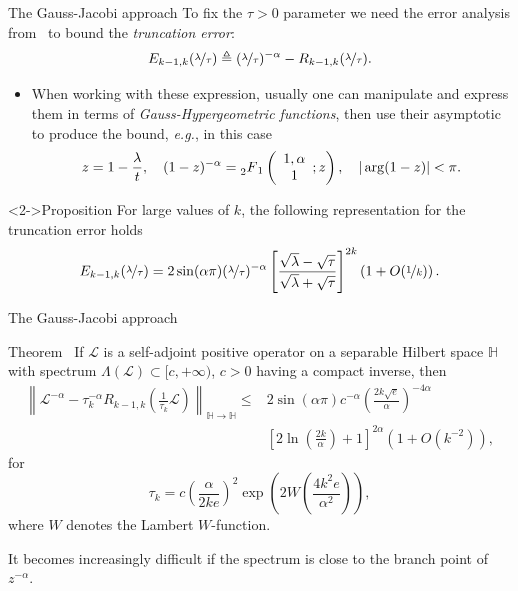 \documentclass[aspectratio=169,xcolor=dvipsnames]{beamer}
\begin{document}
	\begin{frame}{The Gauss-Jacobi approach}
	To fix the $\tau > 0$ parameter we need the error analysis from~\parencite{MR3987166} to bound the \emph{truncation error}:
	\[
	E_{k-1,k}(\nicefrac{\lambda}{\tau}) \triangleq (\nicefrac{\lambda}{\tau})^{-\alpha} - R_{k-1,k}(\nicefrac{\lambda}{\tau}).
	\]
	\begin{itemize}\vspace{-1em}
		\item[\faBomb] When working with these expression, usually one can manipulate and express them in terms of \emph{Gauss-Hypergeometric functions}, then use their asymptotic to produce the bound, \emph{e.g.}, in this case
		\[
		z = 1 - \frac{\lambda}{t}, \quad (1-z)^{-\alpha} = \prescript{}{2}{F}_1\left( \begin{array}{c}
		1, \alpha \\
		1
		\end{array}; z \right), \quad |\arg(1-z)| < \pi.
		\] 
	\end{itemize}\vspace{-0.3em}
	\begin{alertblock}<2->{Proposition \parencite[Proposition 2]{MR3987166}}
	For large values of $k$, the following representation for the truncation error holds\vspace{-0.8em}
	\[
	E_{k-1,k}(\nicefrac{\lambda}{\tau}) = 2 \sin(\alpha \pi) (\nicefrac{\lambda}{\tau})^{-\alpha} \left[ \frac{\sqrt{\lambda} - \sqrt{\tau}}{\sqrt{\lambda} + \sqrt{\tau}} \right]^{2k} \left(1 + O(\nicefrac{1}{k})\right).
	\]
	\end{alertblock}
	\end{frame}

	\begin{frame}{The Gauss-Jacobi approach}
		
	\begin{alertblock}{Theorem~\parencite[Theorem 2]{MR3987166}}
	If $\mathcal{L}$ is a self-adjoint positive operator on a separable Hilbert space $\mathbb{H}$ with spectrum $\Lambda(\mathcal{L}) \subset [c,+\infty)$, $c > 0$ having a compact inverse, then
	\[
	\begin{split}
	\left\| \mathcal{L}^{-\alpha} - \tau_k^{-\alpha} R_{k-1,k} \left( \frac{1}{\tau_k} \mathcal{L} \right) \right\|_{\mathbb{H}\rightarrow\mathbb{H}} \leq & 2 \sin(\alpha \pi) c^{-\alpha} \left( \frac{2 k \sqrt{e}}{\alpha} \right)^{-4\alpha} \\ & \left[2 \ln\left(\frac{2k}{\alpha} \right)+ 1  \right]^{2\alpha} \left(1 + O(k^{-2})\right),
	\end{split}
	\]
	for
	\[
	\tau_k = c \left( \frac{\alpha}{2k e} \right)^2 \exp\left(2 W\left( \frac{4k^2 e}{\alpha^2}\right)  \right),
	\]
	where $W$ denotes the Lambert $W$-function.
	\end{alertblock}

	\faEye\; It becomes \alert{increasingly difficult} if the spectrum is close to the branch point of $z^{-\alpha}$.
	\end{frame}
\end{document}
